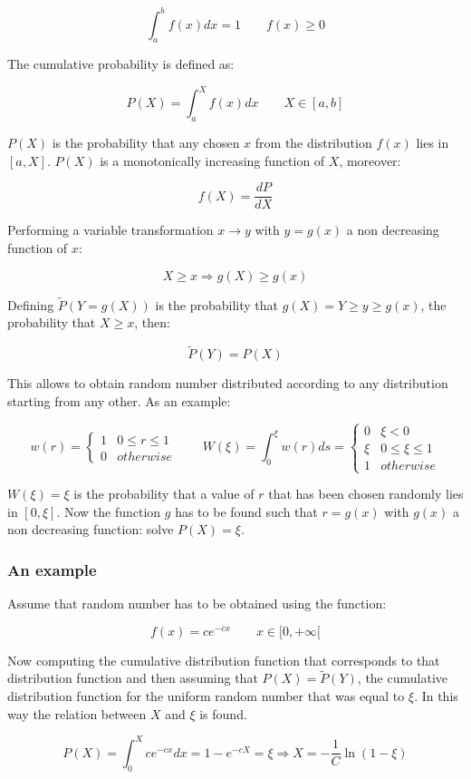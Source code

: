 	$$\int_a^bf(x)dx = 1\qquad f(x)\ge 0$$

	The cumulative probability is defined as:

	$$P(X) = \int_a^X f(x)dx\qquad X\in[a,b]$$

	$P(X)$ is the probability that any chosen $x$ from the distribution $f(x)$ lies in $[a, X]$.
	$P(X)$ is a monotonically increasing function of $X$, moreover:

	$$f(X) = \frac{dP}{dX}$$

	Performing a variable transformation $x\rightarrow y$ with $y = g(x)$ a non decreasing function of $x$:

	$$X\ge x \Rightarrow g(X) \ge g(x)$$

	Defining $\tilde{P}(Y=g(X))$ is the probability that $g(X)=Y\ge y\ge g(x)$, the probability that $X\ge x$, then:

	$$\tilde{P}(Y) = P(X)$$

	This allows to obtain random number distributed according to any distribution starting from any other.
	As an example:

	$$w(r) = \begin{cases}1 &0\le r\le 1\\0 &otherwise\end{cases}\qquad W(\xi) = \int_0^\xi w(r)ds = \begin{cases}0 & \xi<0\\\xi & 0\le\xi\le1\\1 &otherwise\end{cases}$$

	$W(\xi) = \xi$ is the probability that a value of $r$ that has been chosen randomly lies in $[0, \xi]$.
	Now the function $g$ has to be found such that $r = g(x)$ with $g(x)$ a non decreasing function: solve $P(X) = \xi$.

		\subsubsection{An example}
		Assume that random number has to be obtained using the function:

		$$f(x) = ce^{-cx}\qquad x\in[0, +\infty[$$

		Now computing the cumulative distribution function that corresponds to that distribution function and then assuming that $P(X) = \tilde{P}(Y)$, the cumulative distribution function for the uniform random number that was equal to $\xi$.
		In this way the relation between $X$ and $\xi$ is found.

		$$P(X) = \int_0^Xce^{-cx}dx = 1- e^{-cX} = \xi\Rightarrow X = -\frac{1}{C}\ln(1-\xi)$$

